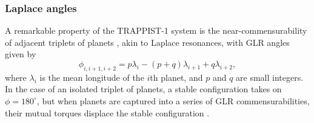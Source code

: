 \documentclass[twocolumn]{aastex63}
\begin{document}
%
%

\subsubsection{Laplace angles}

A remarkable property of the TRAPPIST-1 system is the near-commensurability
of adjacent triplets of planets \citep{Luger2017b}, akin to Laplace resonances, with
GLR angles given by
\begin{equation}
    \phi_{i,i+1,i+2} = p \lambda_i - (p+q) \lambda_{i+1} + q \lambda_{i+2},
\end{equation}
where $\lambda_i$ is the mean longitude of the $i$th planet, and $p$ and
$q$ are small integers.  In
the case of an isolated triplet of planets, a stable configuration takes
on $\phi = 180^\circ$, but when planets are captured into a series of GLR
commensurabilities, their mutual torques displace the stable configuration
\citep{Delisle2017}.
\end{document}
